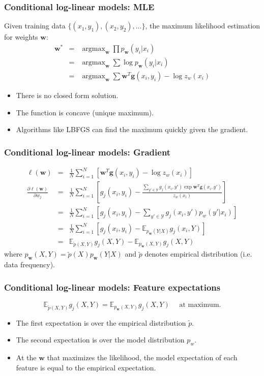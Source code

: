 \documentclass[ignorenonframetext,plain]{beamer}
\DeclareMathOperator*{\argmax}{argmax}
\begin{document}
\begin{frame}\frametitle{Conditional log-linear models: MLE}
Given training data $\{(x_1, y_1), (x_2, y_2), \dots \}$, the
maximum likelihood estimation for weights $\mathbf{w}$: \begin{eqnarray*}
\mathbf{w^*} &=& \argmax_\mathbf{w} \prod p_\mathbf{w}(y_i | x_i) \\
&=& \argmax_\mathbf{w} \sum \log p_\mathbf{w}(y_i | x_i) \\
&=& \argmax_\mathbf{w} \sum \mathbf{w}^T \mathbf{g}(x_i, y_i) - \log z_w(x_i)
\end{eqnarray*}
\begin{itemize}
\item There is no closed form solution.
\item The function is concave (unique maximum).
\item Algorithms like LBFGS can find the maximum quickly given the
  gradient.
\end{itemize}
\end{frame}

\begin{frame}\frametitle{Conditional log-linear models: Gradient}
\begin{eqnarray*}
\ell(\mathbf{w}) &=& \frac{1}{N} \sum_{i=1}^N \left[ \mathbf{w}^T
    \mathbf{g}(x_i, y_i) - \log z_w(x_i) \right] \\
\frac{\partial \ell(\mathbf{w})}{\partial w_j} &=& \frac{1}{N}
  \sum_{i=1}^N \left[ g_j(x_i, y_i) - \frac{\sum_{y'\in\mathcal{Y}}
      g_j(x_i, y') \exp \mathbf{w}^T \mathbf{g}(x_i, y')}{z_w(x_i)}
    \right] \\
&=& \frac{1}{N} \sum_{i=1}^N \left[ g_j(x_i, y_i) -
    \sum_{y'\in\mathcal{Y}} g_j(x_i, y') p_w(y'|x_i) \right] \\
&=& \frac{1}{N} \sum_{i=1}^N \left[ g_j(x_i, y_i) -
    \mathbb{E}_{p_\mathbf{w}(Y|X)} g_j(x_i ,Y) \right] \\
&=& \mathbb{E}_{\tilde{p}(X,Y)} g_j(X,Y) -
  \mathbb{E}_{p_\mathbf{w}(X,Y)} g_j(X,Y)
\end{eqnarray*}
where $p_\mathbf{w}(X,Y) = \tilde{p}(X)p_\mathbf{w}(Y|X)$ and
$\tilde{p}$ denotes empirical distribution (i.e. data frequency).
\end{frame}

\begin{frame}\frametitle{Conditional log-linear models: Feature expectations}
\[
\mathbb{E}_{\tilde{p}(X,Y)} g_j(X,Y) =
  \mathbb{E}_{p_\mathbf{w}(X,Y)} g_j(X,Y)\quad \mbox{ at maximum.}
\]
\begin{itemize}
\item The first expectation is over the empirical distribution
  $\tilde{p}$.
\item The second expectation is over the model distribution $p_w$.
\item At the $\mathbf{w}$ that maximizes the likelihood, the model
  expectation of each feature is equal to the empirical expectation.
\end{itemize}
\end{frame}
\end{document}

